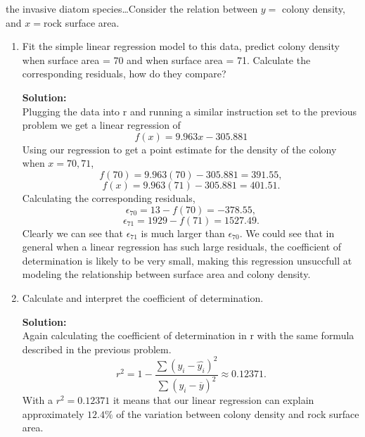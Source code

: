 \documentclass[12pt]{article}
\makeatletter
\theoremstyle{homework}
\newenvironment{exercise}[1]
{\def\@currentlabel{#1}\exercisecore}
{\endexercisecore}
\newcommand{\localhead}[1]{\par\smallskip\noindent\textbf{#1}\nobreak\\}%
\newcommand\solution{\localhead{Solution:}}
\makeatother
\begin{document}
\begin{exercise}{12.24} the invasive diatom species\dots Consider the relation between $y =$ colony density, and 
  $x = $rock surface area.\\

  \begin{enumerate}
    \item Fit the simple linear regression model to this data, predict colony density when surface area = 70 and
    when surface area = 71. Calculate the corresponding residuals, how do they compare?\\
    \solution Plugging the data into r and running a similar instruction set to the previous problem we get a linear regression of
    \begin{equation*}
      f(x) = 9.963x - 305.881
    \end{equation*}
    Using our regression to get a point estimate for the density of the colony when $x = 70, 71$,
    \begin{equation*}
      f(70) = 9.963(70) - 305.881 = 391.55,
    \end{equation*}
    \begin{equation*}
      f(x) = 9.963(71) - 305.881  = 401.51.
    \end{equation*}
    Calculating the corresponding residuals,
    \begin{equation*}
      \epsilon_70 =  13 - f(70) = -378.55,
    \end{equation*}
    \begin{equation*}
      \epsilon_71 =  1929 - f(71) = 1527.49.
    \end{equation*}
    Clearly we can see that $\epsilon_71$ is much larger than  $\epsilon_70$. We could see that in general when a linear 
    regression has such large residuals, the coefficient of determination is likely to be very small, making this regression unsuccfull at modeling the relationship 
    between surface area and colony density. 
    \vspace{.25in}

    \item Calculate and interpret the coefficient of determination.\\
    \solution Again calculating the coefficient of determination in r with the same formula described in the previous problem.\\
    \begin{equation*}
      r^2 = 1 -  \dfrac{\sum(y_i - \hat{y_i})^2}{\sum(y_i - \overline{y})^2} \approx 0.12371.
    \end{equation*}
    With a $r^2 = 0.12371$ it means that our linear regression can explain approximately $12.4\%$ of the variation between 
    colony density and rock surface area.
    \vspace{.25in}




\end{enumerate}
\end{exercise}
\end{document}
